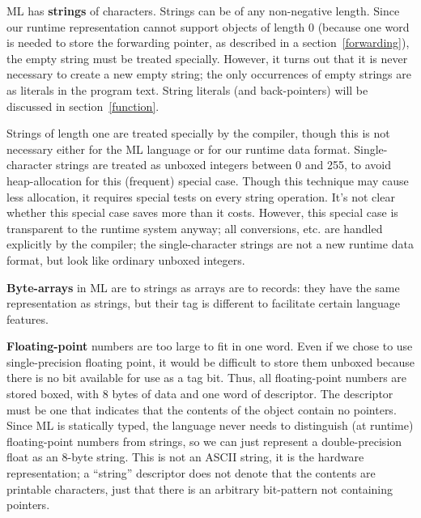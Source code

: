 ML has {\bf strings}
of characters.  Strings can be of any non-negative length.
Since our runtime representation cannot support objects of length 0
(because one word is needed to store the forwarding pointer, as described
in a section~\ref{forwarding}),
the empty string
must be treated specially.  However, it turns out that
it is never necessary to create a new empty string; the only occurrences
of empty strings are as literals in the program text.  String
literals (and back-pointers) will be discussed in section~\ref{function}.

Strings of length one are treated specially by the compiler,
though this is not necessary either for the ML language or for our runtime
data format.  Single-character strings
are treated as unboxed integers
between 0 and 255, to avoid heap-allocation for this (frequent) special case.
Though this technique may cause
less allocation, it requires special tests on every
string operation.  It's not clear whether this special case saves more than
it costs.  However, this special case is transparent to the runtime system
anyway; all conversions, etc. are handled explicitly by the compiler;
the single-character strings are not a new runtime data format, but
look like ordinary unboxed integers.

{\bf Byte-arrays}
in ML are to strings as arrays are to records:  they have the
same representation as strings, but their tag is different to facilitate
certain language features.

{\bf Floating-point} numbers are too large to fit in 
one word.  Even if we chose
to use single-precision floating point, it would be difficult to store
them unboxed
because there is no bit available for use as a tag bit.
Thus, all floating-point numbers are stored boxed, with 8 bytes of data and
one word of descriptor.
The descriptor
must be one that indicates that the contents of the
object contain no pointers.
Since ML is statically typed, the language
never needs to distinguish (at runtime) floating-point numbers from
strings, so we can just represent a double-precision float as an 8-byte
string.  This is not an ASCII string, it is the hardware representation;
a ``string'' descriptor does not denote that the contents are printable
characters, just that there is an arbitrary bit-pattern not containing
pointers.

